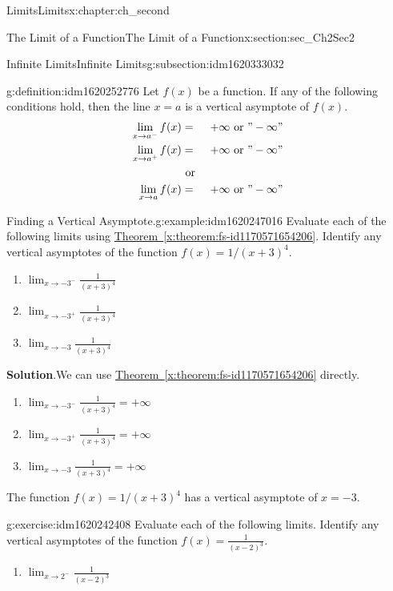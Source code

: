 \documentclass[oneside,10pt,]{book}
\newcommand{\blocktitlefont}{\relax}
\newcommand{\xreffont}{\relax}
\numberwithin{equation}{section}
\newcommand{\amp}{&}
\begin{document}
\begin{chapterptx}{Limits}{}{Limits}{}{}{x:chapter:ch_second}
\begin{sectionptx}{The Limit of a Function}{}{The Limit of a Function}{}{}{x:section:sec_Ch2Sec2}
\begin{subsectionptx}{Infinite Limits}{}{Infinite Limits}{}{}{g:subsection:idm1620333032}
\begin{definition}{}{g:definition:idm1620252776}%
Let \(f(x)\) be a function. If any of the following conditions hold, then the line \(x=a\) is a vertical asymptote of \(f(x).\)%
%
\begin{align*}
\lim_{x\to a^{-} }f(x) \amp = \amp +\infty \text{ or } "-\infty" \\
\lim_{x\to a^{+}}f(x) \amp = \amp +\infty \text{ or } "-\infty" \\
\amp \text{ or } \amp \\
\lim_{x \to a} f(x) \amp =\amp +\infty \text{ or } "-\infty" 
\end{align*}
\end{definition}
\begin{example}{Finding a Vertical Asymptote.}{g:example:idm1620247016}%
Evaluate each of the following limits using \hyperref[x:theorem:fs-id1170571654206]{Theorem~{\xreffont\ref{x:theorem:fs-id1170571654206}}}. Identify any vertical asymptotes of the function \(f(x)=1/ (x+3)^4.\)%
%
\begin{enumerate}
\item{}\(\displaystyle \lim_{x\to -3^- } \frac{1}{ (x+3)^4}\)%
\item{}\(\displaystyle \lim_{x\to -3^+ } \frac{1}{ (x+3)^4}\)%
\item{}\(\displaystyle \lim_{x\to-3} \frac{1}{ (x+3)^4}\)%
\end{enumerate}
\par\smallskip%
\noindent\textbf{\blocktitlefont Solution}.\hypertarget{g:solution:idm1620246248}{}\quad{}We can use \hyperref[x:theorem:fs-id1170571654206]{Theorem~{\xreffont\ref{x:theorem:fs-id1170571654206}}} directly.%
%
\begin{enumerate}
\item{}\(\displaystyle \lim_{x\to -3^- } \frac{1}{ (x+3)^4}=+\infty\)%
\item{}\(\displaystyle \lim_{x\to -3^+ } \frac{1}{ (x+3)^4}=+\infty\)%
\item{}\(\displaystyle \lim_{x\to-3} \frac{1}{ (x+3)^4}=+\infty\)%
\end{enumerate}
The function \(f(x)=1/ (x+3)^4\) has a vertical asymptote of \(x=-3.\)%
\end{example}
\begin{inlineexercise}{}{g:exercise:idm1620242408}%
Evaluate each of the following limits. Identify any vertical asymptotes of the function \(f(x)= \frac{1}{ (x-2)^3 }.\)%
%
\begin{enumerate}
\item{}\(\displaystyle \lim_{x\to 2^- } \frac{1}{ (x-2)^3 }\)%

\end{enumerate}
\end{inlineexercise}
\end{subsectionptx}
\end{sectionptx}
\end{chapterptx}
\end{document}

